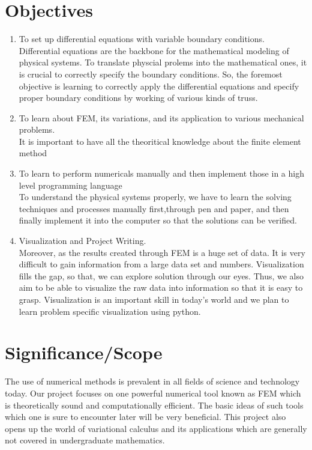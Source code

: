 \section{{\bf{Objectives}}}
{\bf\color{black}
\begin{enumerate}
 \item To set up differential equations with variable boundary conditions. \\
	Differential equations are the backbone for the mathematical modeling of physical systems. To translate physcial prolems into  the mathematical ones,  it is crucial to correctly specify the boundary conditions.  So, the foremost objective is learning to correctly apply the differential equations  and specify proper boundary conditions by working of various kinds of truss. 


 \item To learn about FEM, its variations, and its application to various
 mechanical problems.\\
 It is important to have all the theoritical knowledge about the finite element method

 \item  To learn to perform numericals manually and then implement
 those in a high level programming language\\
 To understand the physical systems properly, we have to learn the solving techniques and processes manually first,through pen and paper, and then finally implement it into the computer so that the solutions can be verified.


 \item Visualization and Project Writing.\\
Moreover, as the results created through FEM is a huge set of data. It is very difficult to gain information from a large data set and numbers. Visualization fills the gap, so that, we can explore solution through our eyes. Thus, we  also aim to be able to visualize the raw data into information so that it is easy to grasp. Visualization is an important skill in today's world and we plan to learn problem specific visualization using python.

\end{enumerate}

}

\section{\bf Significance/Scope}


The use of numerical methods is prevalent in all fields of science and technology today. Our project focuses on one powerful numerical tool known as FEM which is theoretically sound and computationally efficient. The basic ideas of such tools which one is sure to encounter later will be very beneficial. This project also opens up the world of variational calculus and its applications which are generally not covered in undergraduate mathematics.

